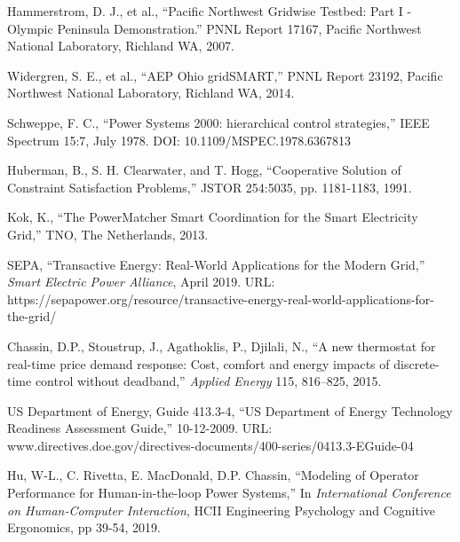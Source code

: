 \documentclass[10pt,twocolumn]{article}
\begin{document}
\small

\begin{thebibliography}{9}

 Hammerstrom, D. J., et al., ``Pacific Northwest Gridwise Testbed: Part I - Olympic Peninsula Demonstration.'' PNNL Report 17167, Pacific Northwest National Laboratory, Richland WA, 2007. 

 Widergren, S. E., et al., ``AEP Ohio gridSMART,'' PNNL Report 23192, Pacific Northwest National Laboratory, Richland WA, 2014. 

 Schweppe, F. C., ``Power Systems 2000: hierarchical control strategies,'' IEEE Spectrum 15:7, July 1978. DOI: 10.1109/MSPEC.1978.6367813

 Huberman, B., S. H. Clearwater, and T. Hogg, ``Cooperative Solution of Constraint Satisfaction Problems,'' JSTOR 254:5035, pp. 1181-1183, 1991. 

 Kok, K., ``The PowerMatcher Smart Coordination for the Smart Electricity Grid,'' TNO, The Netherlands, 2013.

 SEPA, ``Transactive Energy: Real-World Applications for the Modern Grid,'' \textit{Smart Electric Power Alliance}, April 2019. URL:  https://sepapower.org/resource/transactive-energy-real-world-applications-for-the-grid/

 Chassin, D.P., Stoustrup, J., Agathoklis, P., Djilali, N.,  ``A new thermostat for real-time price demand response: Cost, comfort and energy impacts of discrete-time control without deadband,'' \textit{Applied Energy} 115, 816--825, 2015.

 US Department of Energy, Guide 413.3-4, ``US Department of Energy Technology Readiness Assessment Guide,'' 10-12-2009. URL: www.directives.doe.gov/directives-documents/400-series/0413.3-EGuide-04

 Hu, W-L., C. Rivetta, E. MacDonald, D.P. Chassin, ``Modeling of Operator Performance for Human-in-the-loop Power Systems,'' In \textit{International Conference on Human-Computer Interaction}, HCII Engineering Psychology and Cognitive Ergonomics, pp 39-54, 2019.

\end{thebibliography}
\end{document}
